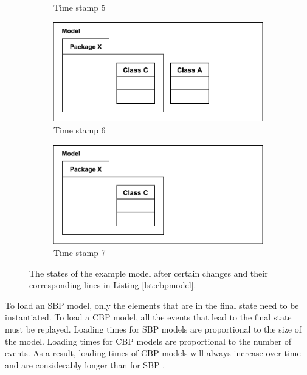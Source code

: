 \documentclass{llncs}
\begin{document}
\begin{figure}[t]
\begin{subfigure}[t]{0.245\linewidth}
        \caption{Time stamp 5}
        \label{fig:illustration_6}
    \end{subfigure}
    \begin{subfigure}[t]{0.245\linewidth}
        \centering
        \includegraphics[width=\linewidth]{images/illustration_7}
        \caption{Time stamp 6}
        \label{fig:illustration_7}
    \end{subfigure}
    \begin{subfigure}[t]{0.245\linewidth}
        \centering
        \includegraphics[width=\linewidth]{images/illustration_8}
        \caption{Time stamp 7}
        \label{fig:illustration_8}
    \end{subfigure}
    
    \caption{The states of the example model after certain changes and their corresponding lines in Listing \ref{lst:cbpmodel}.}
    \label{fig:illustration_cbp}
\end{figure}

To load an SBP model, only the elements that are in the final state need to be instantiated. To load a CBP model, all the events that lead to the final state must be replayed. Loading times for SBP models are proportional to the size of the model. Loading times for CBP models are proportional to the number of events. As a result, loading times of CBP models will always increase over time and are considerably longer than for SBP \cite{yohannis2018towards,mens2002state}. 
\end{document}
